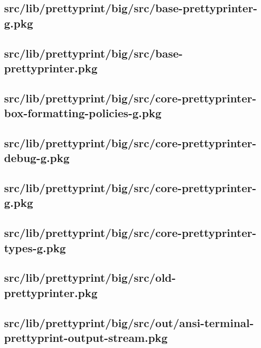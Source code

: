 \subsection{src/lib/prettyprint/big/src/base-prettyprinter-g.pkg}


\subsection{src/lib/prettyprint/big/src/base-prettyprinter.pkg}


\subsection{src/lib/prettyprint/big/src/core-prettyprinter-box-formatting-policies-g.pkg}


\subsection{src/lib/prettyprint/big/src/core-prettyprinter-debug-g.pkg}


\subsection{src/lib/prettyprint/big/src/core-prettyprinter-g.pkg}


\subsection{src/lib/prettyprint/big/src/core-prettyprinter-types-g.pkg}


\subsection{src/lib/prettyprint/big/src/old-prettyprinter.pkg}


\subsection{src/lib/prettyprint/big/src/out/ansi-terminal-prettyprint-output-stream.pkg}


